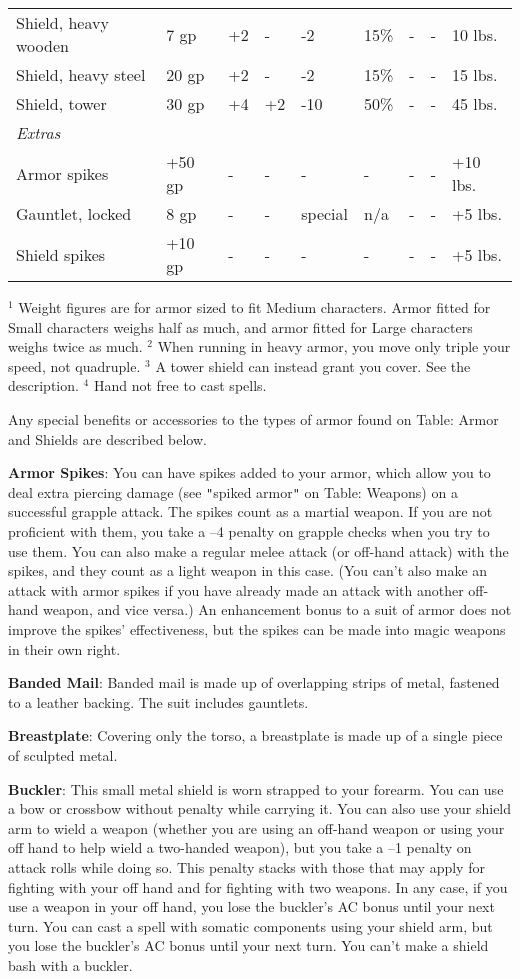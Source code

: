 \begin{table*}[]
\begin{tabular}{lllllllll}
 Shield, heavy wooden& 7 gp& +2& -& -2& 15\%& -& -& 10 lbs. \\
 Shield, heavy steel& 20 gp& +2& -& -2& 15\%& -& -& 15 lbs. \\
 Shield, tower& 30 gp& +4& +2& -10& 50\%& -& -& 45 lbs. \\
 \textit{Extras}   \\
 Armor spikes& +50 gp& -& -& -& -& -& -& +10 lbs. \\
 Gauntlet, locked& 8 gp& -& -& special& n/a& -& -& +5 lbs. \\
 Shield spikes& +10 gp& -& -& -& -& -& -& +5 lbs.\\
\end{tabular}
\(^{1}\) Weight figures are for armor sized to fit Medium characters. Armor fitted for Small characters weighs half as much, and armor fitted for Large characters weighs twice as much.
\(^{2}\) When running in heavy armor, you move only triple your speed, not quadruple.
\(^{3}\) A tower shield can instead grant you cover. See the description.
\(^{4}\) Hand not free to cast spells.
\end{table*}
Any special benefits or accessories to the types of armor found on Table: Armor and Shields are described below.
		
\textbf{Armor Spikes}: You can have spikes added to your armor, which allow you to deal extra piercing damage (see \texttt{{}"{}}spiked armor\texttt{{}"{}} on Table: Weapons) on a successful grapple attack. The spikes count as a martial weapon. If you are not proficient with them, you take a --4 penalty on grapple checks when you try to use them. You can also make a regular melee attack (or off-hand attack) with the spikes, and they count as a light weapon in this case. (You can't also make an attack with armor spikes if you have already made an attack with another off-hand weapon, and vice versa.) An enhancement bonus to a suit of armor does not improve the spikes' effectiveness, but the spikes can be made into magic weapons in their own right.
		
\textbf{Banded Mail}: Banded mail is made up of overlapping strips of metal, fastened to a leather backing. The suit includes gauntlets.
		
\textbf{Breastplate}: Covering only the torso, a breastplate is made up of a single piece of sculpted metal.
		
\textbf{Buckler}: This small metal shield is worn strapped to your forearm. You can use a bow or crossbow without penalty while carrying it. You can also use your shield arm to wield a weapon (whether you are using an off-hand weapon or using your off hand to help wield a two-handed weapon), but you take a --1 penalty on attack rolls while doing so. This penalty stacks with those that may apply for fighting with your off hand and for fighting with two weapons. In any case, if you use a weapon in your off hand, you lose the buckler's AC bonus until your next turn. You can cast a spell with somatic components using your shield arm, but you lose the buckler's AC bonus until your next turn. You can't make a shield bash with a buckler.
		
